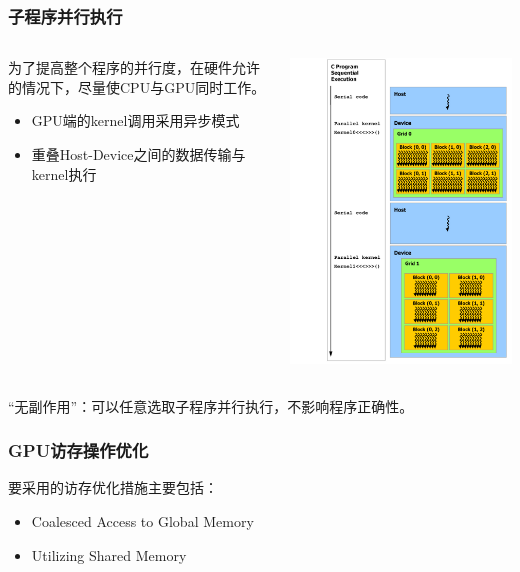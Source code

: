 \documentclass{beamer}
\begin{document}
\begin{frame}
  \frametitle{子程序并行执行}
  \begin{columns}
    \begin{column}{0.5\textwidth}
      为了提高整个程序的并行度，在硬件允许的情况下，尽量使CPU与GPU同时工作。
      \begin{itemize}
        \item GPU端的kernel调用采用异步模式
        \item 重叠Host-Device之间的数据传输与kernel执行
      \end{itemize}
    \end{column}
    \begin{column}{0.5\textwidth}
      \includegraphics[scale=0.35]{images/heterogeneous-programming.png}
    \end{column}
  \end{columns}
  \pause
  \alert{“无副作用”}：可以任意选取子程序并行执行，不影响程序正确性。
\end{frame}

\begin{frame}
  \frametitle{GPU访存操作优化}
  要采用的访存优化措施主要包括：
  \begin{itemize}
    \item Coalesced Access to Global Memory
    \item Utilizing Shared Memory
  \end{itemize}
\end{frame}
\end{document}
